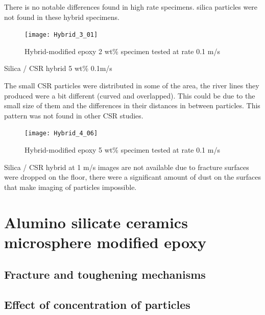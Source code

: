 \documentclass[numbers=noendperiod,chapterprefix=on]{icldt} %
\begin{document}
{There is no notable differences found in high rate specimens. silica particles were not found in these hybrid specimens.

\begin{figure}[!htpb]
\centering
\texttt{[image: Hybrid\_3\_01]}
\caption{Hybrid-modified epoxy 2 wt\% specimen tested at rate 0.1 m/s}\label{Hybrid_3_01}
\end{figure}
\FloatBarrier


Silica / CSR hybrid 5 wt\% 0.1m/s

The small CSR particles were distributed in some of the area, the river lines they produced were a bit different (curved and overlapped). This could be due to the small size of them and the differences in their distances in between particles. This pattern was not found in other CSR studies. 

\begin{figure}[!htpb]
\centering
\texttt{[image: Hybrid\_4\_06]}
\caption{Hybrid-modified epoxy 5 wt\% specimen tested at rate 0.1 m/s}\label{Hybrid_4_06}
\end{figure}
\FloatBarrier


Silica / CSR hybrid at 1 m/s images are not available due to fracture surfaces were dropped on the floor, there were a significant amount of dust on the surfaces that make imaging of particles impossible. 

\section{Alumino silicate ceramics microsphere modified epoxy}

\subsection{Fracture and toughening mechanisms}

\subsection{Effect of concentration of particles}

}
\end{document}
